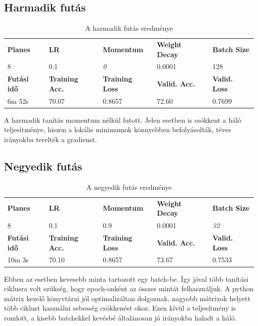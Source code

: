 \subsection{Harmadik futás}
\begin{table}[h]
	\begin{tabular}{|l|l|l|l|l|}
		\hline
		\textbf{Planes} & \textbf{LR} & \textbf{Momentum} & \textbf{Weight Decay} & \textbf{Batch Size} \\
		8 & 0.1 & \textit{0} & 0.0001 & 128 \\ \hline
		\textbf{Futási idő} & \textbf{Training Acc.} & \textbf{Training Loss} & \textbf{Valid. Acc.} & \textbf{Valid. Loss} \\
		6m 52s & 70.07 & 0.8657 & 72.60 & 0.7699 \\ \hline
	\end{tabular}
	\caption{A harmadik futás eredménye}
\end{table}
A harmadik tanítás momentum nélkül futott. Jelen esetben is csökkent a háló teljesítménye, hiszen a lokális minimumok könnyebben befolyásolták, téves irányokba terelték a gradienst.




\subsection{Negyedik futás}
\begin{table}[h]
	\begin{tabular}{|l|l|l|l|l|}
		\hline
		\textbf{Planes} & \textbf{LR} & \textbf{Momentum} & \textbf{Weight Decay} & \textbf{Batch Size} \\
		8 & 0.1 & 0.9 & 0.0001 & \textit{32} \\ \hline
		\textbf{Futási idő} & \textbf{Training Acc.} & \textbf{Training Loss} & \textbf{Valid. Acc.} & \textbf{Valid. Loss} \\
		10m 3s & 70.10 & 0.8657 & 73.67 & 0.7533 \\ \hline
	\end{tabular}
	\caption{A negyedik futás eredménye}
\end{table}
Ebben az esetben kevesebb minta tartozott egy batch-be. Így jóval több tanítási ciklusra volt szükség, hogy epoch-onként az összes mintát felhasználjuk. A python mátrix kezelő könyvtárai jól optimalizáltan dolgoznak, nagyobb mátrixok helyett több ciklust használni sebesség csökkenést okoz. Ezen kívül a teljesítmény is romlott, a kisebb batchekkel kevésbé általánosan jó irányokba haladt a háló.

